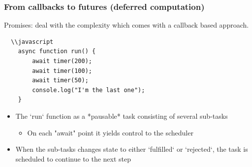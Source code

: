 \begin{frame}[fragile]
	\frametitle{From callbacks to futures (deferred computation)}
	Promises: deal with the complexity which comes with a callback based approach.
	\begin{block}{}
		\begin{verbatim}
  \\javascript
    async function run() {
        await timer(200);
        await timer(100);
        await timer(50);
        console.log("I'm the last one");
    }
\end{verbatim}
	\end{block}
	\begin{itemize}
		\item The `run` function as a *pausable* task consisting of several sub-tasks
		\begin{itemize}
			\item On each "await" point it yields control to the scheduler
		\end{itemize}
		\item When the sub-tasks changes state to either `fulfilled` or `rejected`, the task is scheduled to continue to the next step
	\end{itemize}
	
\end{frame}

